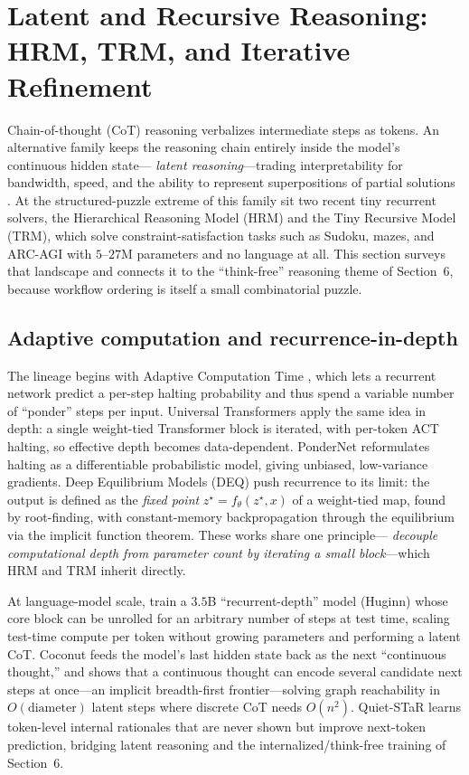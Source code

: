 \section{Latent and Recursive Reasoning: HRM, TRM, and Iterative Refinement}

Chain-of-thought (CoT) reasoning verbalizes intermediate steps as tokens. An alternative
family keeps the reasoning chain entirely inside the model's continuous hidden state---%
\emph{latent reasoning}---trading interpretability for bandwidth, speed, and the ability to
represent superpositions of partial solutions \citep{lat:zhu2025survey,lat:hao2024coconut}.
At the structured-puzzle extreme of this family sit two recent tiny recurrent solvers, the
Hierarchical Reasoning Model (HRM) and the Tiny Recursive Model (TRM), which solve
constraint-satisfaction tasks such as Sudoku, mazes, and ARC-AGI with $5$--$27$M parameters
and no language at all. This section surveys that landscape and connects it to the
``think-free'' reasoning theme of Section~6, because workflow ordering is itself a small
combinatorial puzzle.

\subsection{Adaptive computation and recurrence-in-depth}
The lineage begins with Adaptive Computation Time \citep{lat:graves2016act}, which lets a
recurrent network predict a per-step halting probability and thus spend a variable number of
``ponder'' steps per input. Universal Transformers \citep{lat:dehghani2019ut} apply the same
idea in depth: a single weight-tied Transformer block is iterated, with per-token ACT
halting, so effective depth becomes data-dependent. PonderNet \citep{lat:banino2021pondernet}
reformulates halting as a differentiable probabilistic model, giving unbiased, low-variance
gradients. Deep Equilibrium Models (DEQ) \citep{lat:bai2019deq} push recurrence to its limit:
the output is defined as the \emph{fixed point} $z^\star = f_\theta(z^\star, x)$ of a
weight-tied map, found by root-finding, with constant-memory backpropagation through the
equilibrium via the implicit function theorem. These works share one principle---%
\emph{decouple computational depth from parameter count by iterating a small block}---which
HRM and TRM inherit directly.

At language-model scale, \citet{lat:geiping2025recurrent} train a $3.5$B
``recurrent-depth'' model (Huginn) whose core block can be unrolled for an arbitrary number
of steps at test time, scaling test-time compute per token without growing parameters and
performing a latent CoT. Coconut \citep{lat:hao2024coconut} feeds the model's last hidden
state back as the next ``continuous thought,'' and shows that a continuous thought can encode
several candidate next steps at once---an implicit breadth-first frontier---solving graph
reachability in $O(\text{diameter})$ latent steps where discrete CoT needs $O(n^2)$.
Quiet-STaR \citep{lat:zelikman2024quietstar} learns token-level internal rationales that are
never shown but improve next-token prediction, bridging latent reasoning and the
internalized/think-free training of Section~6.

